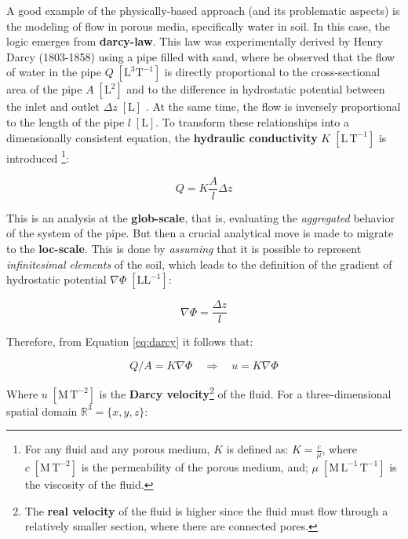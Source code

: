 \documentclass[./main_en.tex]{subfiles}
\begin{document}
\par A good example of the physically-based approach (and its problematic aspects) is the modeling of flow in porous media, specifically water in soil. In this case, the logic emerges from \textbf{\gls{darcy-law}}. This law was experimentally derived by Henry Darcy (1803-1858) using a pipe filled with sand, where he observed that the flow of water in the pipe $Q \; [\text{L}^{3}\text{T}^{-1}]$ is directly proportional to the cross-sectional area of the pipe $A \; [\text{L}^{2}]$ and to the difference in hydrostatic potential between the inlet and outlet $\Delta z \; [\text{L}]$ \cite{Simmons2008a}. At the same time, the flow is inversely proportional to the length of the pipe $l \; [\text{L}]$. To transform these relationships into a dimensionally consistent equation, the \textbf{hydraulic conductivity} $K \; [\text{L}\,\text{T}^{-1}]$ is introduced \footnote{For any fluid and any porous medium, $K$ is defined as: $K = \frac{c}{\mu}$, where $c \; [\text{M}\,\text{T}^{-2}]$ is the permeability of the porous medium, and; $\mu \; [\text{M}\,\text{L}^{-1}\,\text{T}^{-1}]$ is the viscosity of the fluid.}:
\begin{linenomath*}
\begin{equation}
\label{eq:darcy}
Q  = K \frac{A}{l}\Delta z 
\end{equation}
\end{linenomath*}
\noindent This is an analysis at the \textbf{\gls{glob-scale}}, that is, evaluating the \textit{aggregated} behavior of the \gls{system} of the pipe. But then a crucial analytical move is made to migrate to the \textbf{\gls{loc-scale}}. This is done by \textit{assuming} that it is possible to represent \textit{infinitesimal elements} of the soil, which leads to the definition of the gradient of hydrostatic potential $\nabla \Phi \; [\text{L}\text{L}^{-1}]$:
\begin{linenomath*}
\begin{equation}
\label{eq:darcy-2}
\nabla \Phi = \frac{\Delta z}{l} 
\end{equation}
\end{linenomath*}
\noindent Therefore, from Equation \eqref{eq:darcy} it follows that:
\begin{linenomath*}
\begin{equation}
\label{eq:darcy-3}
Q/A = K \nabla \Phi \quad \Rightarrow \quad u = K \nabla \Phi
\end{equation}
\end{linenomath*}
\noindent Where $u \; [\text{M}\,\text{T}^{-2}]$ is the \textbf{Darcy velocity}\footnote{The \textbf{real velocity} of the fluid is higher since the fluid must flow through a relatively smaller section, where there are connected pores.} of the fluid. For a three-dimensional spatial domain $\mathbb{R}^3=\{x, y, z \}$:
\end{document}
